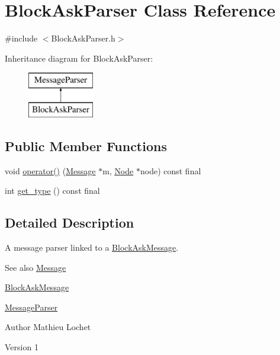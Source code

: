 \hypertarget{classBlockAskParser}{}\section{Block\+Ask\+Parser Class Reference}
\label{classBlockAskParser}


{\ttfamily \#include $<$Block\+Ask\+Parser.\+h$>$}

Inheritance diagram for Block\+Ask\+Parser\+:\begin{figure}[H]
\begin{center}
\leavevmode
\includegraphics[height=2.000000cm]{classBlockAskParser}
\end{center}
\end{figure}
\subsection*{Public Member Functions}
\begin{DoxyCompactItemize}
\item 
void \mbox{\hyperlink{classBlockAskParser_a32d280786db26389f58175681ba35261}{operator()}} (\mbox{\hyperlink{classMessage}{Message}} $\ast$m, \mbox{\hyperlink{classNode}{Node}} $\ast$node) const final
\item 
int \mbox{\hyperlink{classBlockAskParser_add75da897c34702c33790947c9754500}{get\+\_\+type}} () const final
\end{DoxyCompactItemize}


\subsection{Detailed Description}
A message parser linked to a \mbox{\hyperlink{classBlockAskMessage}{Block\+Ask\+Message}}. \begin{DoxySeeAlso}{See also}
\mbox{\hyperlink{classMessage}{Message}} 

\mbox{\hyperlink{classBlockAskMessage}{Block\+Ask\+Message}} 

\mbox{\hyperlink{classMessageParser}{Message\+Parser}}
\end{DoxySeeAlso}
\begin{DoxyAuthor}{Author}
Mathieu Lochet 
\end{DoxyAuthor}
\begin{DoxyVersion}{Version}
1 
\end{DoxyVersion}


